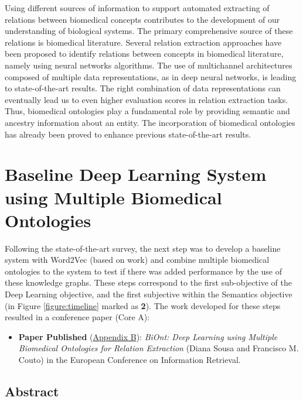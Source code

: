 Using different sources of information to support automated extracting of relations between biomedical concepts contributes to the development of our understanding of biological systems. The primary comprehensive source of these relations is biomedical literature. Several relation extraction approaches have been proposed to identify relations between concepts in biomedical literature, namely using neural networks algorithms. The use of multichannel architectures composed of multiple data representations, as in deep neural networks, is leading to state-of-the-art results. The right combination of data representations can eventually lead us to even higher evaluation scores in relation extraction tasks. Thus, biomedical ontologies play a fundamental role by providing semantic and ancestry information about an entity. The incorporation of biomedical ontologies has already been proved to enhance previous state-of-the-art results.


\section{Baseline Deep Learning System using Multiple Biomedical Ontologies}

Following the state-of-the-art survey, the next step was to develop a baseline system with Word2Vec (based on \cite{lamurias2019bo} work) and combine multiple biomedical ontologies to the system to test if there was added performance by the use of these knowledge graphs. These steps correspond to the first sub-objective of the Deep Learning objective, and the first subjective within the Semantics objective (in Figure \ref{figure:timeline} marked as \textbf{2}). The work developed for these steps resulted in a conference paper (Core A): 

\begin{itemize}
    \item{\textbf{Paper Published} \citep{sousa2020biont} (\hyperlink{AB}{Appendix B}): \textit{BiOnt: Deep Learning using Multiple Biomedical Ontologies for Relation Extraction} (Diana Sousa and Francisco M. Couto) in the European Conference on Information Retrieval.}
\end{itemize}

\subsection{Abstract}

